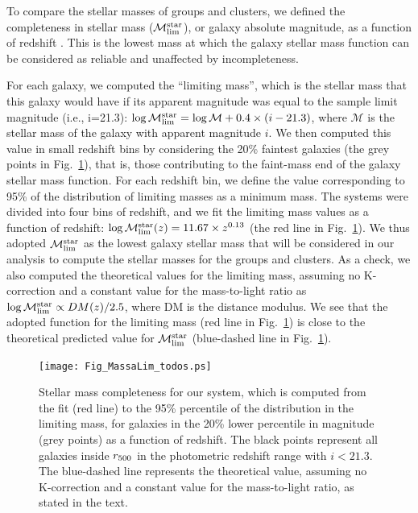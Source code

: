 \documentclass{aa}
\begin{document}
To compare the stellar masses of groups and clusters, we
  defined the completeness in stellar mass ($\mathcal{M}_{\rm lim}^{\rm star}$),
  or galaxy absolute magnitude, as a function of redshift \citep[as
  adopted in ][]{giodini09,bolzonella10,pozzetti10}.  This is the
  lowest mass at which the galaxy stellar mass function can be
  considered as reliable and unaffected by incompleteness.

For each galaxy, we computed the ``limiting mass'', which is
  the stellar mass that this galaxy would have if its apparent
  magnitude was equal to the sample limit magnitude (i.e., i=21.3):
  $\log \mathcal{M}_{\rm lim}^{\rm star} = \log \mathcal{M} +0.4 \times (i-21.3)$, where $\mathcal{M}$
  is the stellar mass of the galaxy with apparent magnitude $i$.
  We then computed this value in small redshift bins by considering
  the 20\%  faintest galaxies (the grey points in
  Fig.~\ref{fig:Mlim}), that is, those contributing to the faint-mass end
  of the galaxy stellar mass function.  For each redshift bin, we
  define the value corresponding to 95\% of the
  distribution of limiting masses as a minimum mass.  The systems were divided into four
  bins of redshift, and we fit the limiting mass values as a function
  of redshift: $ \log \mathcal{M}_{\rm lim}^{\rm star} (z) = 11.67 \times
  z^{0.13}$ (the red line in Fig.~\ref{fig:Mlim}).  We thus adopted
  $\mathcal{M}_{\rm lim}^{\rm star}$ as the lowest galaxy stellar mass that will
  be considered in our analysis to compute the stellar masses for the
  groups and clusters.   As a check, we also computed the theoretical values
  for the limiting mass, assuming
  no K-correction and a constant value for the mass-to-light ratio as 
  $ \log \mathcal{M}_{\rm lim}^{\rm star} \propto DM (z)/2.5$, where DM is the distance modulus.
  We see that the adopted function for the limiting mass (red line in Fig.~\ref{fig:Mlim})  is 
  close to the theoretical predicted value for 
   $\mathcal{M}_{\rm lim}^{\rm star}$ (blue-dashed line in Fig.~\ref{fig:Mlim}).


\begin{figure}[h]
\centering
\texttt{[image: Fig\_MassaLim\_todos.ps]}
\caption{Stellar mass completeness for our system, which is computed from the
  fit (red line) to the 95\% percentile of the distribution in the
  limiting mass, for galaxies in the 20\% lower percentile in magnitude
  (grey points) as a function of redshift. The black points represent
  all galaxies inside $r_{\rm 500}$ in the photometric redshift
  range with $i < 21.3$. The blue-dashed line represents the theoretical
  value, assuming no K-correction and a constant value for the mass-to-light ratio, as stated in the text.}
\label{fig:Mlim}
\end{figure}
\end{document}
